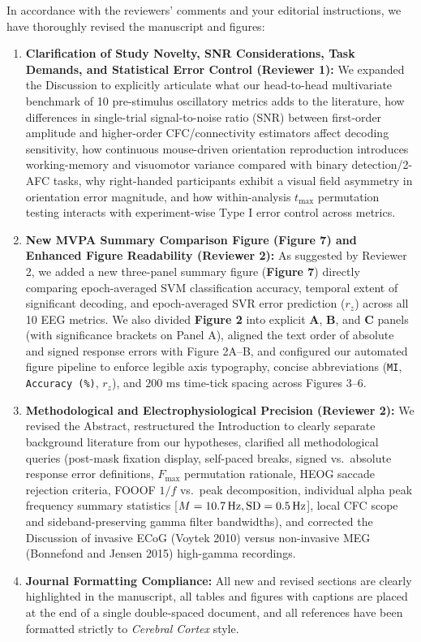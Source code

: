 \documentclass[11pt]{article}
\begin{document}
In accordance with the reviewers' comments and your editorial instructions, we have thoroughly revised the manuscript and figures:
\begin{enumerate}
    \item \textbf{Clarification of Study Novelty, SNR Considerations, Task Demands, and Statistical Error Control (Reviewer 1):} We expanded the Discussion to explicitly articulate what our head-to-head multivariate benchmark of 10 pre-stimulus oscillatory metrics adds to the literature, how differences in single-trial signal-to-noise ratio (SNR) between first-order amplitude and higher-order CFC/connectivity estimators affect decoding sensitivity, how continuous mouse-driven orientation reproduction introduces working-memory and visuomotor variance compared with binary detection/2-AFC tasks, why right-handed participants exhibit a visual field asymmetry in orientation error magnitude, and how within-analysis $t_{\max}$ permutation testing interacts with experiment-wise Type I error control across metrics.
    \item \textbf{New MVPA Summary Comparison Figure (Figure 7) and Enhanced Figure Readability (Reviewer 2):} As suggested by Reviewer 2, we added a new three-panel summary figure (\textbf{Figure 7}) directly comparing epoch-averaged SVM classification accuracy, temporal extent of significant decoding, and epoch-averaged SVR error prediction ($r_z$) across all 10 EEG metrics. We also divided \textbf{Figure 2} into explicit \textbf{A}, \textbf{B}, and \textbf{C} panels (with significance brackets on Panel A), aligned the text order of absolute and signed response errors with Figure 2A--B, and configured our automated figure pipeline to enforce legible axis typography, concise abbreviations (\texttt{MI}, \texttt{Accuracy (\%)}, $r_z$), and $200\text{ ms}$ time-tick spacing across Figures 3--6.
    \item \textbf{Methodological and Electrophysiological Precision (Reviewer 2):} We revised the Abstract, restructured the Introduction to clearly separate background literature from our hypotheses, clarified all methodological queries (post-mask fixation display, self-paced breaks, signed vs.\ absolute response error definitions, $F_{\max}$ permutation rationale, HEOG saccade rejection criteria, FOOOF $1/f$ vs.\ peak decomposition, individual alpha peak frequency summary statistics [$M = 10.7\,\text{Hz}{}, \text{SD} = 0.5\,\text{Hz}{}$], local CFC scope and sideband-preserving gamma filter bandwidths), and corrected the Discussion of invasive ECoG (Voytek 2010) versus non-invasive MEG (Bonnefond and Jensen 2015) high-gamma recordings.
    \item \textbf{Journal Formatting Compliance:} All new and revised sections are clearly highlighted in the manuscript, all tables and figures with captions are placed at the end of a single double-spaced document, and all references have been formatted strictly to \textit{Cerebral Cortex} style.
\end{enumerate}
\end{document}
